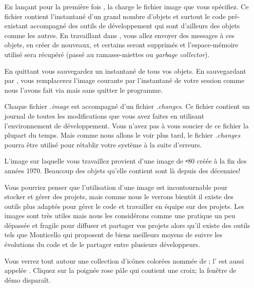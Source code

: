 \documentclass[a4paper,10pt,twoside]{book}
\begin{document}
En lançant pour la première fois \pharo, la 
charge le fichier image que vous spécifiez. Ce fichier contient
l'instantané d'un grand nombre d'objets et surtout le code
pré-existant accompagné des outils de développement qui sont
d'ailleurs des objets comme les autres. En travaillant dans \pharo, vous
allez envoyer des messages à ces objets, en créer de nouveaux, et
certains seront supprimés et l'espace-mémoire utilisé sera récupéré
(\ie passé au ramasse-miettes ou \emph{garbage collector}).

En quittant \pharo vous sauvegardez un instantané de tous vos objets. 
En sauvegardant par , vous remplacerez l'image courante par 
l'instantané de votre session comme nous l'avons fait via  mais
sans quitter le programme. %

Chaque fichier \emph{.image} est accompagné d'un fichier \emph{.changes}.
Ce fichier contient un journal de toutes les modifications que vous avez 
faites en utilisant l'environnement de développement.
Vous n'avez pas à vous soucier de ce fichier la plupart du temps.
Mais comme nous allons le voir plus tard, le fichier \emph{.changes} 
pourra être utilisé pour rétablir votre système \pharo à la suite d'erreurs.

L'image sur laquelle vous travaillez provient d'une image de \st-80 créée 
à la fin des années 1970. Beaucoup des objets qu'elle contient sont là 
depuis des décennies!

Vous pourriez penser que l'utilisation d'une image est incontournable pour 
stocker et gérer des projets, mais comme nous le verrons bientôt il existe 
des outils plus adaptés pour gérer le code et travailler en équipe sur des projets.
Les images sont très utiles mais nous les considérons comme une pratique un peu 
dépassée et fragile pour diffuser et partager vos projets alors qu'il existe 
des outils tels que Monticello qui proposent de biens meilleurs moyens de 
suivre les évolutions du code et de le partager entre plusieurs développeurs.


Vous verrez tout autour une collection d'icônes  colorées
nommée %
 de \bam; l'
 est aussi appelée .
Cliquez sur la poignée rose pâle qui contient une croix; la fenêtre
de démo disparaît. %
\end{document}
